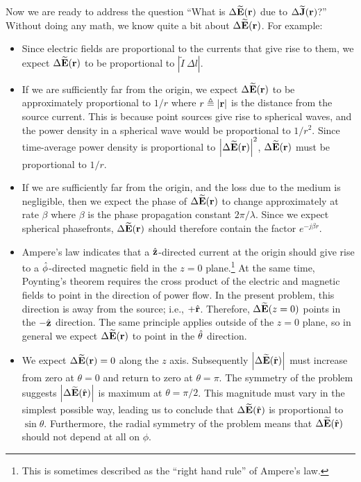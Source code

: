 Now we are ready to address the question ``What is $\Delta\widetilde{\bf E}({\bf r})$ due to $\Delta\widetilde{\bf J}({\bf r})$?''
Without doing any math, we know quite a bit about $\Delta\widetilde{\bf E}({\bf r})$.
For example:
%
\begin{itemize}
\item Since electric fields are proportional to the currents that give rise to them, we expect $\Delta\widetilde{\bf E}({\bf r})$ to be proportional to $\left|\widetilde{I}~\Delta l\right|$.
\item If we are sufficiently far from the origin, we expect $\Delta\widetilde{\bf E}({\bf r})$ to be approximately proportional to $1/r$ where $r\triangleq\left|{\bf r}\right|$ is the distance from the source current.  This is because point sources give rise to spherical waves, and the power density in a spherical wave would be proportional to $1/r^2$.
Since time-average power density is proportional to $\left|\Delta\widetilde{\bf E}({\bf r})\right|^2$, $\Delta\widetilde{\bf E}({\bf r})$ must be proportional to $1/r$.
\item If we are sufficiently far from the origin, and the loss due to the medium is negligible, then we expect the phase of $\Delta\widetilde{\bf E}({\bf r})$ to change approximately at rate $\beta$ where $\beta$ is the phase propagation constant $2\pi/\lambda$. Since we expect spherical phasefronts, $\Delta\widetilde{\bf E}({\bf r})$ should therefore contain the factor $e^{-j\beta r}$.  
\item Ampere's law 
indicates that a $\hat{\bf z}$-directed current at the origin should give rise to a $\hat{\bf \phi}$-directed magnetic field in the $z=0$ plane.\footnote{This is sometimes described as the ``right hand rule'' of Ampere's law.}  
At the same time, Poynting's theorem 
requires the cross product of the electric and magnetic fields to point in the direction of power flow.
In the present problem, this direction is away from the source; i.e., $+\hat{\bf r}$.  Therefore, $\Delta\widetilde{\bf E}(z=0)$ points in the $-\hat{\bf z}$ direction.  The same principle applies outside of the $z=0$ plane, so in general we expect $\Delta\widetilde{\bf E}({\bf r})$ to point in the $\hat{\bf \theta}$ direction.
\item  
We expect $\Delta\widetilde{\bf E}({\bf r})=0$ along the $z$ axis.
Subsequently $\left|\Delta\widetilde{\bf E}(\hat{\bf r})\right|$ must increase from zero at $\theta=0$ and return to zero at $\theta=\pi$.
The symmetry of the problem suggests $\left|\Delta\widetilde{\bf E}(\hat{\bf r})\right|$ is maximum at $\theta=\pi/2$.
This magnitude must vary in the simplest possible way, leading us to conclude that $\Delta\widetilde{\bf E}(\hat{\bf r})$ is proportional to $\sin\theta$.
Furthermore, the radial symmetry of the problem means that $\Delta\widetilde{\bf E}(\hat{\bf r})$ should not depend at all on $\phi$.  
\end{itemize}
